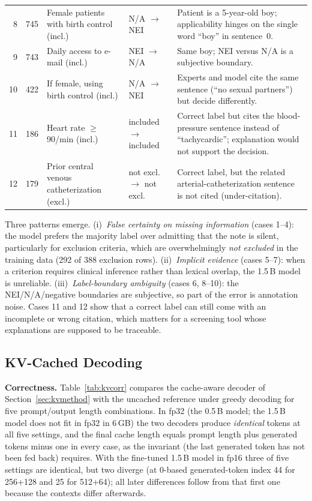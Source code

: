 \begin{table}[t]
\begin{tabular}{rlp{4.1cm}lp{6.8cm}}
8 & 745 & Female patients with birth control (incl.) & N/A $\rightarrow$ NEI & Patient is a 5-year-old boy; applicability hinges on the single word ``boy'' in sentence~0. \\
9 & 743 & Daily access to e-mail (incl.) & NEI $\rightarrow$ N/A & Same boy; NEI versus N/A is a subjective boundary. \\
10 & 422 & If female, using birth control (incl.) & N/A $\rightarrow$ NEI & Experts and model cite the same sentence (``no sexual partners'') but decide differently. \\
11 & 186 & Heart rate $\ge$ 90/min (incl.) & included $\rightarrow$ included & Correct label but cites the blood-pressure sentence instead of ``tachycardic''; explanation would not support the decision. \\
12 & 179 & Prior central venous catheterization (excl.) & not excl. $\rightarrow$ not excl. & Correct label, but the related arterial-catheterization sentence is not cited (under-citation). \\
\hline
\end{tabular}
\end{table}

Three patterns emerge. (i)~\emph{False certainty on missing information} (cases 1--4): the model prefers the majority label over admitting that the note is silent, particularly for exclusion criteria, which are overwhelmingly \emph{not excluded} in the training data (292 of 388 exclusion rows). (ii)~\emph{Implicit evidence} (cases 5--7): when a criterion requires clinical inference rather than lexical overlap, the 1.5\,B model is unreliable. (iii)~\emph{Label-boundary ambiguity} (cases 6, 8--10): the NEI/N/A/negative boundaries are subjective, so part of the error is annotation noise. Cases 11 and 12 show that a correct label can still come with an incomplete or wrong citation, which matters for a screening tool whose explanations are supposed to be traceable.

\subsection{KV-Cached Decoding}
\label{sec:kvres}
\textbf{Correctness.} Table~\ref{tab:kvcorr} compares the cache-aware decoder of Section~\ref{sec:kvmethod} with the uncached reference under greedy decoding for five prompt/output length combinations. In fp32 (the 0.5\,B model; the 1.5\,B model does not fit in fp32 in 6\,GB) the two decoders produce \emph{identical} tokens at all five settings, and the final cache length equals prompt length plus generated tokens minus one in every case, as the invariant (the last generated token has not been fed back) requires. With the fine-tuned 1.5\,B model in fp16 three of five settings are identical, but two diverge (at 0-based generated-token index 44 for 256+128 and 25 for 512+64); all later differences follow from that first one because the contexts differ afterwards.

